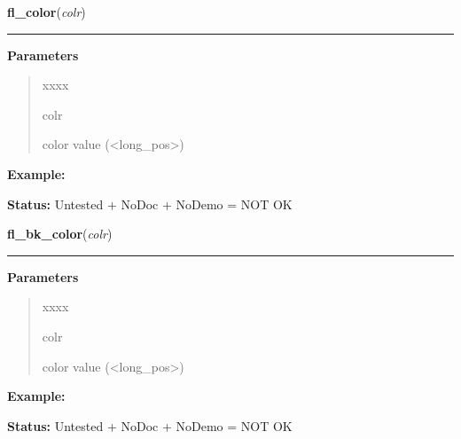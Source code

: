 \hspace{.8\funcindent}\begin{boxedminipage}{\funcwidth}

    \raggedright \textbf{fl\_color}(\textit{colr})

    \vspace{-1.5ex}

    \rule{\textwidth}{0.5\fboxrule}
\setlength{\parskip}{2ex}
\setlength{\parskip}{1ex}
      \textbf{Parameters}
      \vspace{-1ex}

      \begin{quote}
        \begin{Ventry}{xxxx}

          \item[colr]

          color value ({\textless}long\_pos{\textgreater})

        \end{Ventry}

      \end{quote}

\textbf{Example:} 

\textbf{Status:} Untested + NoDoc + NoDemo = NOT OK



    \end{boxedminipage}

    \label{xformslib:library:fl_bk_color}

    \vspace{0.5ex}

\hspace{.8\funcindent}\begin{boxedminipage}{\funcwidth}

    \raggedright \textbf{fl\_bk\_color}(\textit{colr})

    \vspace{-1.5ex}

    \rule{\textwidth}{0.5\fboxrule}
\setlength{\parskip}{2ex}
\setlength{\parskip}{1ex}
      \textbf{Parameters}
      \vspace{-1ex}

      \begin{quote}
        \begin{Ventry}{xxxx}

          \item[colr]

          color value ({\textless}long\_pos{\textgreater})

        \end{Ventry}

      \end{quote}

\textbf{Example:} 

\textbf{Status:} Untested + NoDoc + NoDemo = NOT OK



    \end{boxedminipage}

